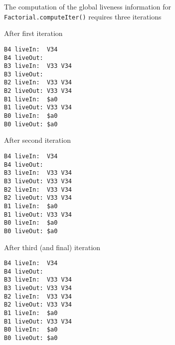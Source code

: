 \documentclass[8pt,a4paper,compress]{beamer}
\begin{document}
\begin{frame}[fragile]
\pause

The computation of the global liveness information for \lstinline{Factorial.computeIter()} requires three iterations

\pause
\bigskip

After first iteration
\begin{lstlisting}[language={}]
B4 liveIn:  V34
B4 liveOut:
B3 liveIn:  V33 V34
B3 liveOut:
B2 liveIn:  V33 V34
B2 liveOut: V33 V34
B1 liveIn:  $a0                                                                 
B1 liveOut: V33 V34                                                             
B0 liveIn:  $a0
B0 liveOut: $a0
\end{lstlisting}

\pause

After second iteration
\begin{lstlisting}[language={}]
B4 liveIn:  V34
B4 liveOut:
B3 liveIn:  V33 V34
B3 liveOut: V33 V34
B2 liveIn:  V33 V34
B2 liveOut: V33 V34
B1 liveIn:  $a0                                                                 
B1 liveOut: V33 V34                                                             
B0 liveIn:  $a0
B0 liveOut: $a0
\end{lstlisting}
\end{frame}

\begin{frame}[fragile]
\pause

After third (and final) iteration
\begin{lstlisting}[language={}]
B4 liveIn:  V34
B4 liveOut:
B3 liveIn:  V33 V34
B3 liveOut: V33 V34
B2 liveIn:  V33 V34
B2 liveOut: V33 V34
B1 liveIn:  $a0
B1 liveOut: V33 V34
B0 liveIn:  $a0                                                                 
B0 liveOut: $a0
\end{lstlisting}
\end{frame}
\end{document}
